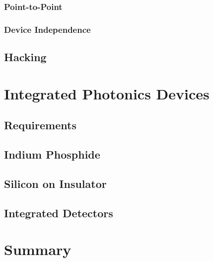 \subsubsection*{Point-to-Point}

\subsubsection*{Device Independence}

\subsection{Hacking}

\section{Integrated Photonics Devices}

\subsection{Requirements}

\subsection{Indium Phosphide}

\subsection{Silicon on Insulator}

\subsection{Integrated Detectors}

\section{Summary}


